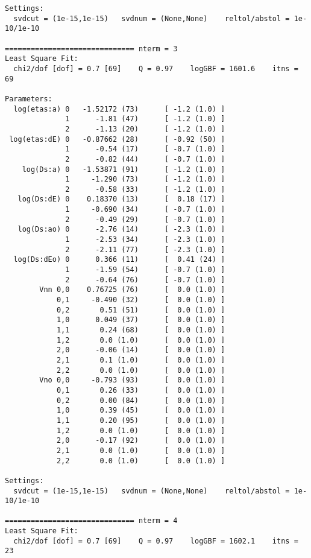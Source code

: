 \documentclass[letterpaper,10pt,english]{sphinxmanual}
\begin{document}
\begin{Verbatim}[commandchars=\\\{\}]
Settings:
  svdcut = (1e-15,1e-15)   svdnum = (None,None)    reltol/abstol = 1e-10/1e-10

============================== nterm = 3
Least Square Fit:
  chi2/dof [dof] = 0.7 [69]    Q = 0.97    logGBF = 1601.6    itns = 69

Parameters:
  log(etas:a) 0   -1.52172 (73)      [ -1.2 (1.0) ]  
              1      -1.81 (47)      [ -1.2 (1.0) ]  
              2      -1.13 (20)      [ -1.2 (1.0) ]  
 log(etas:dE) 0   -0.87662 (28)      [ -0.92 (50) ]  
              1      -0.54 (17)      [ -0.7 (1.0) ]  
              2      -0.82 (44)      [ -0.7 (1.0) ]  
    log(Ds:a) 0   -1.53871 (91)      [ -1.2 (1.0) ]  
              1     -1.290 (73)      [ -1.2 (1.0) ]  
              2      -0.58 (33)      [ -1.2 (1.0) ]  
   log(Ds:dE) 0    0.18370 (13)      [  0.18 (17) ]  
              1     -0.690 (34)      [ -0.7 (1.0) ]  
              2      -0.49 (29)      [ -0.7 (1.0) ]  
   log(Ds:ao) 0      -2.76 (14)      [ -2.3 (1.0) ]  
              1      -2.53 (34)      [ -2.3 (1.0) ]  
              2      -2.11 (77)      [ -2.3 (1.0) ]  
  log(Ds:dEo) 0      0.366 (11)      [  0.41 (24) ]  
              1      -1.59 (54)      [ -0.7 (1.0) ]  
              2      -0.64 (76)      [ -0.7 (1.0) ]  
        Vnn 0,0    0.76725 (76)      [  0.0 (1.0) ]  
            0,1     -0.490 (32)      [  0.0 (1.0) ]  
            0,2       0.51 (51)      [  0.0 (1.0) ]  
            1,0      0.049 (37)      [  0.0 (1.0) ]  
            1,1       0.24 (68)      [  0.0 (1.0) ]  
            1,2       0.0 (1.0)      [  0.0 (1.0) ]  
            2,0      -0.06 (14)      [  0.0 (1.0) ]  
            2,1       0.1 (1.0)      [  0.0 (1.0) ]  
            2,2       0.0 (1.0)      [  0.0 (1.0) ]  
        Vno 0,0     -0.793 (93)      [  0.0 (1.0) ]  
            0,1       0.26 (33)      [  0.0 (1.0) ]  
            0,2       0.00 (84)      [  0.0 (1.0) ]  
            1,0       0.39 (45)      [  0.0 (1.0) ]  
            1,1       0.20 (95)      [  0.0 (1.0) ]  
            1,2       0.0 (1.0)      [  0.0 (1.0) ]  
            2,0      -0.17 (92)      [  0.0 (1.0) ]  
            2,1       0.0 (1.0)      [  0.0 (1.0) ]  
            2,2       0.0 (1.0)      [  0.0 (1.0) ]  

Settings:
  svdcut = (1e-15,1e-15)   svdnum = (None,None)    reltol/abstol = 1e-10/1e-10

============================== nterm = 4
Least Square Fit:
  chi2/dof [dof] = 0.7 [69]    Q = 0.97    logGBF = 1602.1    itns = 23


\end{Verbatim}
\end{document}
